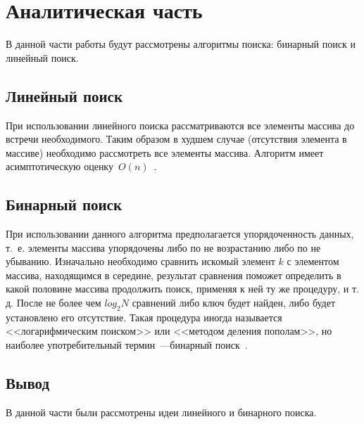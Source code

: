 \chapter{Аналитическая часть}
В данной части работы будут рассмотрены алгоритмы поиска: бинарный поиск и линейный поиск.






\section{Линейный поиск}
При использовании линейного поиска рассматриваются все элементы массива до встречи необходимого. Таким образом в худшем случае (отсутствия элемента в массиве) необходимо рассмотреть все элементы массива. Алгоритм имеет асимптотическую оценку~$O(n)$~\cite{book_knut}.



\section{Бинарный поиск}
При использовании данного алгоритма предполагается упорядоченность данных, т.~е. элементы массива упорядочены либо по не возрастанию либо по не убыванию. Изначально необходимо сравнить искомый элемент $k$ с элементом массива, находящимся в середине, результат сравнения поможет определить в какой половине массива продолжить поиск, применяя к ней ту же процедуру, и т. д. После не более чем 
$log_{2}{N}$ сравнений либо ключ будет найден, либо будет установлено его отсутствие. Такая процедура иногда называется <<логарифмическим поиском>> или <<методом деления пополам>>, но наиболее
употребительный термин~---бинарный поиск~\cite{book_knut}.









\section*{Вывод}
В данной части были рассмотрены идеи линейного и бинарного поиска.
